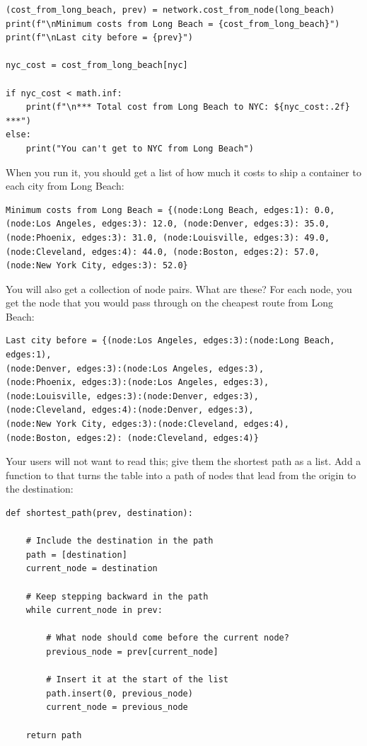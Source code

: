 \begin{verbatim}
(cost_from_long_beach, prev) = network.cost_from_node(long_beach)
print(f"\nMinimum costs from Long Beach = {cost_from_long_beach}")
print(f"\nLast city before = {prev}")

nyc_cost = cost_from_long_beach[nyc]

if nyc_cost < math.inf:
    print(f"\n*** Total cost from Long Beach to NYC: ${nyc_cost:.2f} ***")
else:
    print("You can't get to NYC from Long Beach")
\end{verbatim}

When you run it, you should get a list of how much it costs to ship a
container to each city from Long Beach:
\begin{verbatim}
Minimum costs from Long Beach = {(node:Long Beach, edges:1): 0.0,
(node:Los Angeles, edges:3): 12.0, (node:Denver, edges:3): 35.0,
(node:Phoenix, edges:3): 31.0, (node:Louisville, edges:3): 49.0,
(node:Cleveland, edges:4): 44.0, (node:Boston, edges:2): 57.0,
(node:New York City, edges:3): 52.0}
\end{verbatim}

You will also get a collection of node pairs. What are these? For each
node, you get the node that you would pass through on the cheapest
route from Long Beach:
\begin{verbatim}
Last city before = {(node:Los Angeles, edges:3):(node:Long Beach, edges:1),
(node:Denver, edges:3):(node:Los Angeles, edges:3),
(node:Phoenix, edges:3):(node:Los Angeles, edges:3),
(node:Louisville, edges:3):(node:Denver, edges:3),
(node:Cleveland, edges:4):(node:Denver, edges:3),
(node:New York City, edges:3):(node:Cleveland, edges:4),
(node:Boston, edges:2): (node:Cleveland, edges:4)}
\end{verbatim}

Your users will not want to read this; give them the shortest path as a list.  Add a function to
 that turns the  table into a path of
nodes that lead from the origin to the destination:

\begin{verbatim}
def shortest_path(prev, destination):

    # Include the destination in the path
    path = [destination]
    current_node = destination

    # Keep stepping backward in the path
    while current_node in prev:

        # What node should come before the current node?
        previous_node = prev[current_node]

        # Insert it at the start of the list
        path.insert(0, previous_node)
        current_node = previous_node

    return path
\end{verbatim}


